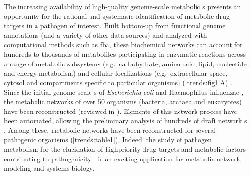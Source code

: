 The increasing availability of high-quality genome-scale 
metabolic s \cite{Oberhardt:2009jw} presents an opportunity for the 
rational and systematic identification of metabolic drug 
targets in a pathogen of interest. Built bottom-up from functional 
genome annotations (and a variety of other data sources) and 
analyzed with computational methods such as \gls{fba}, these biochemical networks can account 
for hundreds to thousands of metabolites participating in enzymatic 
reactions across a range of metabolic subsystems (e.g.\ carbohydrate, 
amino acid, lipid, nucleotide and energy metabolism) and cellular 
localizations (e.g.\ extracellular space, cytosol and compartments 
specific to particular organisms) (\autoref{trends:fig1}A) \cite{Thiele:2010fr}. Since the 
initial genome-scale s of \textit{Escherichia coli} \cite{Edwards:2000cn,Reed:2003bj} 
and Haemophilus influenzae \cite{Edwards:1999ix,Schilling:2000ig}, the metabolic networks of over 
50 organisms (bacteria, archaea and eukaryotes) have been 
reconstructed (reviewed in \cite{Oberhardt:2009jw}). Elements of this network 
 process have been automated, allowing the preliminary 
analysis of hundreds of draft network s \cite{Henry:2010dg}. Among 
these, metabolic networks have been reconstructed for several pathogenic 
organisms (\autoref{trends:table1}). Indeed, the study of pathogen metabolism-for the 
elucidation of highpriority drug targets and metabolic factors 
contributing to pathogenicity—is an exciting application for 
metabolic network modeling and systems biology.

